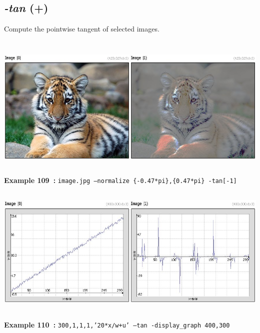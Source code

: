 \documentclass[a4paper,11pt,twoside]{book}
\begin{document}
\subsection{\emph{-tan} (+)}\vspace*{-0.5em}
Compute the pointwise tangent of selected images.
\begin{center}\includegraphics[keepaspectratio=true,height=7cm,width=\textwidth]{img/gmic_def109.jpg}\\
{\footnotesize \textbf{Example 109~:} \texttt{image.jpg --normalize \{-0.47*pi\},\{0.47*pi\} -tan[-1]}}
\\\includegraphics[keepaspectratio=true,height=7cm,width=\textwidth]{img/gmic_def110.jpg}\\
{\footnotesize \textbf{Example 110~:} \texttt{300,1,1,1,'20*x/w+u' --tan -display\_graph 400,300}}
\end{center}
\end{document}
